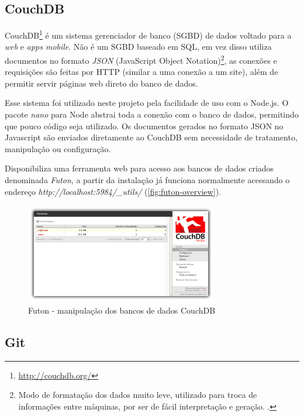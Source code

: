 \subsection{CouchDB}\label{sec:couchdb}

CouchDB\footnote{\url{http://couchdb.org/}} é um sistema gerenciador de banco (SGBD) de dados voltado para a \textit{web} e \textit{apps mobile}. Não é um SGBD baseado em SQL, em vez disso utiliza documentos no formato \textit{JSON} (JavaScript Object Notation)\footnote{Modo de formatação dos dados muito leve, utilizado para troca de informações entre máquinas, por ser de fácil interpretação e geração. \cite{json-couch}.}, as conexões e requisições são feitas por HTTP (similar a uma conexão a um site), além de permitir servir páginas web direto do banco de dados.

Esse sistema foi utilizado neste projeto pela facilidade de uso com o Node.js. O pacote \textit{nano} para Node abstrai toda a conexão com o banco de dados, permitindo que pouco código seja utilizado. Os documentos gerados no formato JSON no Javascript são enviados diretamente ao CouchDB sem necessidade de tratamento, manipulação ou configuração.

Disponibiliza uma ferramenta web para acesso aos bancos de dados criados denominada \textit{Futon}, a partir da instalação já funciona normalmente acessando o endereço \textit{http://localhost:5984/\_utils/} (\autoref{fig:futon-overview}).

\begin{figure}[htb]
	\caption{\label{fig:futon-overview}Futon - manipulação dos bancos de dados CouchDB}
	\begin{center}
		\includegraphics[width=0.75\textwidth]{img/futon-overview.png}
	\end{center}
\end{figure}

\subsection{Git}\label{sec:git}

